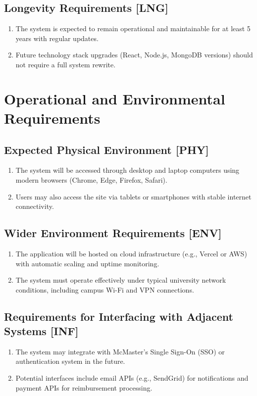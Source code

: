 \documentclass[12pt]{article}
\begin{document}
\begin{enumerate}
  \subsection{Longevity Requirements [LNG]}
    \begin{enumerate}
        \item The system is expected to remain operational and maintainable for at least 5 years with regular updates.
        \item Future technology stack upgrades (React, Node.js, MongoDB versions) should not require a full system rewrite.
    \end{enumerate}

\section{Operational and Environmental Requirements}
  \subsection{Expected Physical Environment [PHY]}
    \begin{enumerate}
      \item The system will be accessed through desktop and laptop computers using modern browsers (Chrome, Edge, Firefox, Safari).
      \item Users may also access the site via tablets or smartphones with stable internet connectivity.
    \end{enumerate}

  \subsection{Wider Environment Requirements [ENV]}
    \begin{enumerate}
      \item The application will be hosted on cloud infrastructure (e.g., Vercel or AWS) with automatic scaling and uptime monitoring.
      \item The system must operate effectively under typical university network conditions, including campus Wi-Fi and VPN connections.
    \end{enumerate}

  \subsection{Requirements for Interfacing with Adjacent Systems [INF]}
    \begin{enumerate}
      \item The system may integrate with McMaster's Single Sign-On (SSO) or authentication system in the future.
      \item Potential interfaces include email APIs (e.g., SendGrid) for notifications and payment APIs for reimbursement processing.
    \end{enumerate}


\end{enumerate}
\end{document}
